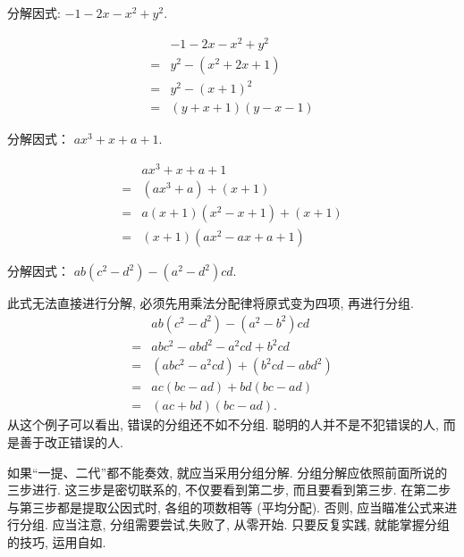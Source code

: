 \begin{example}[瞄准公式]
	分解因式: $-1-2 x-x^{2}+y^{2}$.
\end{example}
\begin{solution}
	\begin{align*}
		  & -1-2 x-x^{2}+y^{2}             \\
		= & y^{2}-\left(x^{2}+2 x+1\right) \\
		= & y^{2}-(x+1)^{2}                \\
		= & (y+x+1)(y-x-1)
	\end{align*}
\end{solution}

\begin{example}[瞄准公式]
	分解因式： $a x^{3}+x+a+1$.
\end{example}
\begin{solution}
	\begin{align*}
		  & a x^{3}+x+a+1                      \\
		= & \left(a x^{3}+a\right)+(x+1)       \\
		= & a(x+1)\left(x^{2}-x+1\right)+(x+1) \\
		= & (x+1)\left(a x^{2}-a x+a+1\right)
	\end{align*}
\end{solution}

\begin{example}[从零开始]
	分解因式： $a b\left(c^{2}-d^{2}\right)-\left(a^{2}-d^{2}\right) c d.$
\end{example}
\begin{solution}
	此式无法直接进行分解, 必须先用乘法分配律将原式变为四项, 再进行分组.
	\begin{align*}
		  & a b\left(c^{2}-d^{2}\right)-\left(a^{2}-b^{2}\right) c d          \\
		= & a b c^{2}-a b d^{2}-a^{2} c d+b^{2} c d                           \\
		= & \left(a b c^{2}-a^{2} c d\right)+\left(b^{2} c d-a b d^{2}\right) \\
		= & a c(b c-a d)+b d(b c-a d)                                         \\
		= & (a c+b d)(b c-a d) .
	\end{align*}
	从这个例子可以看出, 错误的分组还不如不分组. 聪明的人并不是不犯错误的人, 而是善于改正错误的人.
\end{solution}
如果“一提、二代”都不能奏效, 就应当采用分组分解. 分组分解应依照前面所说的三步进行. 这三步是密切联系的, 不仅要看到第二步, 而且要看到第三步. 在第二步与第三步都是提取公因式时, 各组的项数相等 (平均分配). 否则, 应当瞄准公式来进行分组. 应当注意, 分组需要尝试,失败了, 从零开始. 只要反复实践, 就能掌握分组的技巧, 运用自如.

